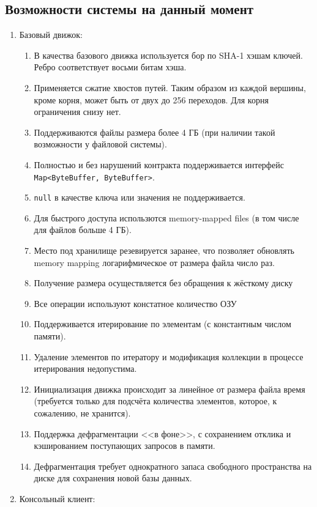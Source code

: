 \documentclass[a4paper]{article}
\renewcommand{\t}{\texttt}
\begin{document}
\subsection{Возможности системы на данный момент}
  \begin{enumerate}
  \item Базовый движок:
    \begin{enumerate}
    \item В качества базового движка используется бор по SHA-1 хэшам ключей. Ребро соответствует восьми
          битам хэша.
    \item Применяется сжатие хвостов путей. Таким образом из каждой вершины, кроме корня,
          может быть от двух до 256 переходов. Для корня ограничения снизу нет.
    \item Поддерживаются файлы размера более 4 ГБ (при наличии такой возможности у файловой системы).
    \item Полностью и без нарушений контракта поддерживается интерфейс \t{Map<ByteBuffer, ByteBuffer>}.
    \item \t{null} в качестве ключа или значения не поддерживается.
    \item Для быстрого доступа использются memory-mapped files (в том числе для файлов больше 4 ГБ).
    \item Место под хранилище резевируется заранее, что позволяет обновлять memory mapping логарифмическое
          от размера файла число раз.
    \item Получение размера осуществляется без обращения к жёсткому диску
    \item Все операции используют констатное количество ОЗУ
    \item Поддерживается итерирование по элементам (с константным числом памяти).
    \item Удаление элементов по итератору и модификация коллекции в процессе итерирования недопустима.
    \item Инициализация движка происходит за линейное от размера файла время (требуется только для подсчёта
          количества элементов, которое, к сожалению, не хранится).
    \item Поддержка дефрагментации <<в фоне>>, с сохранением отклика и кэшированием поступающих запросов в памяти.
    \item Дефрагментация требует однократного запаса свободного пространства на диске для сохранения новой базы данных.
    \end{enumerate}
  \item Консольный клиент:

\end{enumerate}
\end{document}
